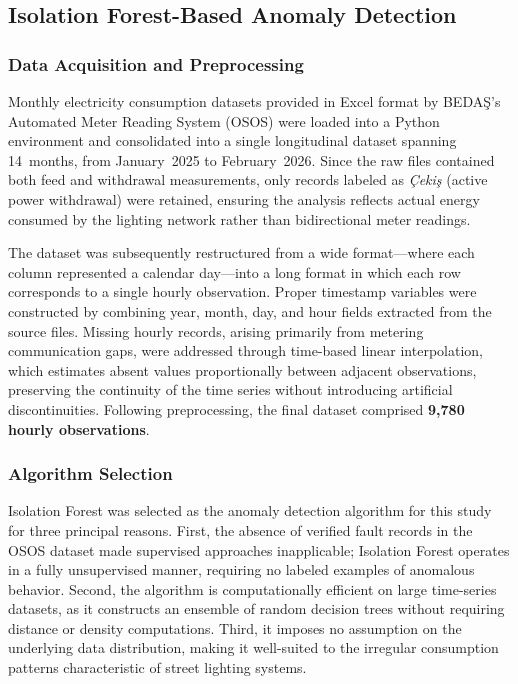 \documentclass{article}
\begin{document}
\subsection{Isolation Forest-Based Anomaly Detection}

\subsubsection{Data Acquisition and Preprocessing}

Monthly electricity consumption datasets provided in Excel format by BEDA\c{S}'s Automated Meter Reading System (OSOS) were loaded into a Python environment and consolidated into a single longitudinal dataset spanning 14~months, from January~2025 to February~2026. Since the raw files contained both feed and withdrawal measurements, only records labeled as \textit{\c{C}eki\c{s}} (active power withdrawal) were retained, ensuring the analysis reflects actual energy consumed by the lighting network rather than bidirectional meter readings.

The dataset was subsequently restructured from a wide format---where each column represented a calendar day---into a long format in which each row corresponds to a single hourly observation. Proper timestamp variables were constructed by combining year, month, day, and hour fields extracted from the source files. Missing hourly records, arising primarily from metering communication gaps, were addressed through time-based linear interpolation, which estimates absent values proportionally between adjacent observations, preserving the continuity of the time series without introducing artificial discontinuities. Following preprocessing, the final dataset comprised \textbf{9,780 hourly observations}.

\subsubsection{Algorithm Selection}

Isolation Forest was selected as the anomaly detection algorithm for this study for three principal reasons. First, the absence of verified fault records in the OSOS dataset made supervised approaches inapplicable; Isolation Forest operates in a fully unsupervised manner, requiring no labeled examples of anomalous behavior. Second, the algorithm is computationally efficient on large time-series datasets, as it constructs an ensemble of random decision trees without requiring distance or density computations. Third, it imposes no assumption on the underlying data distribution, making it well-suited to the irregular consumption patterns characteristic of street lighting systems.
\end{document}
